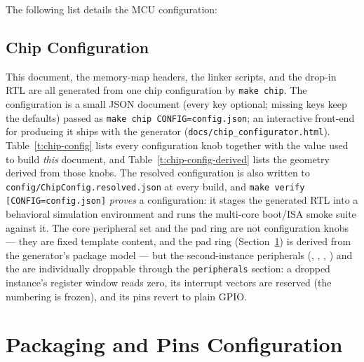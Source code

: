 \documentclass[11pt,pdftex,portrait,letterpaper]{article}
\begin{document}
The following list details the MCU configuration:
\begin{itemize}
	
	
\end{itemize}

\subsection{Chip Configuration} \label{ss:chipConfig}

This document, the memory-map headers, the linker scripts, and the drop-in RTL are all generated from one chip configuration by \texttt{make chip}. The configuration is a small JSON document (every key optional; missing keys keep the \AsicNameForUserGuide{} defaults) passed as \texttt{make chip CONFIG=config.json}; an interactive front-end for producing it ships with the generator (\texttt{docs/chip\_configurator.html}). Table~\ref{t:chip-config} lists every configuration knob together with the value used to build \emph{this} document, and Table~\ref{t:chip-config-derived} lists the geometry derived from those knobs. The resolved configuration is also written to \texttt{config/ChipConfig.resolved.json} at every build, and \texttt{make verify [CONFIG=config.json]} \emph{proves} a configuration: it stages the generated RTL into a behavioral simulation environment and runs the multi-core boot/ISA smoke suite against it. The core peripheral set and the pad ring are not configuration knobs --- they are fixed template content, and the pad ring (Section~\ref{s:pinsConfig}) is derived from the generator's package model --- but the second-instance peripherals (, , , ) and the  are individually droppable through the \texttt{peripherals} section: a dropped instance's register window reads zero, its interrupt vectors are reserved (the numbering is frozen), and its pins revert to plain GPIO.



\newpage



\section{Packaging and Pins Configuration} \label{s:pinsConfig}
\end{document}

